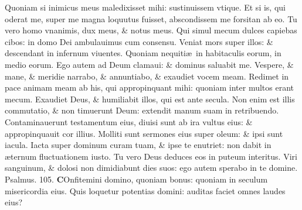 \documentclass[a5paper,10pt]{book}
\def\ae{æ}
\begin{document}
\begin{multicols*}{2}
\newline \color{red} Q\color{black}uoniam si inimicus meus maledixisset mihi: sustinuissem vtique.
\newline \color{red} E\color{black}t si is, qui oderat me, super me magna loquutus fuisset, abscondissem me forsitan ab eo.
\newline \color{red} T\color{black}u vero homo vnanimis, dux meus, \& notus meus.
\newline \color{red} Q\color{black}ui simul mecum dulces capiebas cibos: in domo Dei ambulauimus cum consensu.
\newline \color{red} V\color{black}eniat mors super illos: \& descendant in infernum viuentes.
\newline \color{red} Q\color{black}uoniam nequiti\ae \ in habitaculis eorum, in medio eorum.
\newline \color{red} E\color{black}go autem ad Deum clamaui: \& dominus saluabit me.
\newline \color{red} V\color{black}espere, \& mane, \& meridie narrabo, \& annuntiabo, \& exaudiet vocem meam.
\newline \color{red} R\color{black}edimet in pace animam meam ab his, qui appropinquant mihi: quoniam inter multos erant mecum.
\newline \color{red} E\color{black}xaudiet Deus, \& humiliabit illos, qui est ante secula.
\newline \color{red} N\color{black}on enim est illis commutatio, \& non timuerunt Deum: extendit manum suam in retribuendo.
\newline \color{red} C\color{black}ontaminauerunt testamentum eius, diuisi sunt ab ira vultus eius: \& appropinquauit cor illius.
\newline \color{red} M\color{black}olliti sunt sermones eius super oleum: \& ipsi sunt iacula.
\newline \color{red} I\color{black}acta super dominum curam tuam, \& ipse te enutriet: non dabit in \ae ternum fluctuationem iusto.
\newline \color{red} T\color{black}u vero Deus deduces eos in puteum interitus.
\newline \color{red} V\color{black}iri sanguinum, \& dolosi non dimidiabunt dies suos: ego autem sperabo in te domine. \quad \color{red} Psalmus. 105. \color{black}
\vspace{-.5em}
\lettrine[lines=2]{\bfseries \color{red} C}{}Onfitemini domino, quoniam bonus: quoniam in seculum misericordia eius.
\newline \color{red} Q\color{black}uis loquetur potentias domini: auditas faciet omnes laudes eius?

\end{multicols*}
\end{document}
